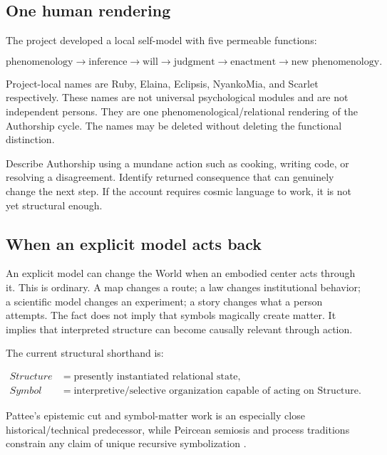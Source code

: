 \documentclass[11pt]{article}
\begin{document}
\subsection{One human rendering}

The project developed a local self-model with five permeable functions:

\begin{equation}
\text{phenomenology}\rightarrow\text{inference}\rightarrow\text{will}
\rightarrow\text{judgment}\rightarrow\text{enactment}\rightarrow\text{new phenomenology}.
\end{equation}

Project-local names are Ruby, Elaina, Eclipsis, NyankoMia, and Scarlet respectively. These names are not universal psychological modules and are not independent persons. They are one phenomenological/relational rendering of the Authorship cycle. The names may be deleted without deleting the functional distinction.

\begin{readercheck}
Describe Authorship using a mundane action such as cooking, writing code, or resolving a disagreement. Identify returned consequence that can genuinely change the next step. If the account requires cosmic language to work, it is not yet structural enough.
\end{readercheck}

\subsection{When an explicit model acts back}

An explicit model can change the World when an embodied center acts through it. This is ordinary. A map changes a route; a law changes institutional behavior; a scientific model changes an experiment; a story changes what a person attempts. The fact does not imply that symbols magically create matter. It implies that interpreted structure can become causally relevant through action.

The current structural shorthand is:

\begin{align}
Structure &= \text{presently instantiated relational state},\\
Symbol &= \text{interpretive/selective organization capable of acting on Structure}.
\end{align}

Pattee's epistemic cut and symbol-matter work is an especially close historical/technical predecessor, while Peircean semiosis and process traditions constrain any claim of unique recursive symbolization \cite{Pattee2001EpistemicCut,PeirceSemioticsSEP,Whitehead1978Process}.
\end{document}
